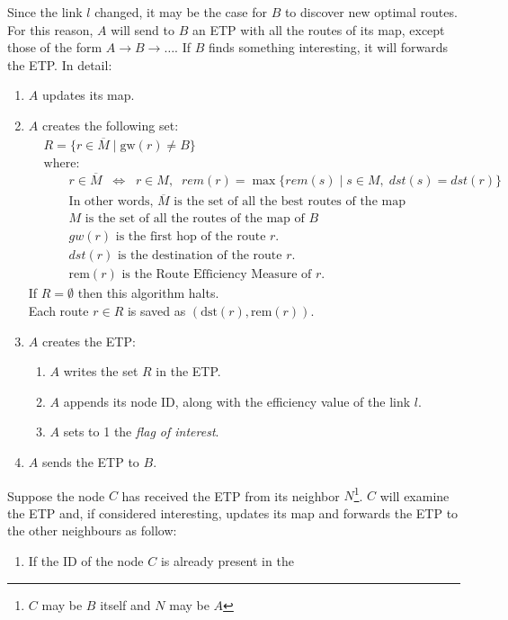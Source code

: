 \documentclass[a4paper]{article}
\newcommand{\T}[1]{\textrm{#1}}
\newcommand{\eal}[1]{{\begin{align*} #1 \end{align*}}}
\def\ove#1{{\overline{#1}}}
\newcommand{\qq}{\qquad}
\def\0{{\emptyset}}
\def\={{\;\Leftrightarrow\;}}
\begin{document}
\begin{description}
		Since the link $l$ changed, it may be the case for $B$ to
		discover new optimal routes.
		For this reason, $A$ will send to $B$ an ETP with all the routes of its
		map, except those of the form $A\rightarrow B\rightarrow \dots$. If $B$ finds
		something interesting, it will forwards the ETP. In detail:
		\begin{enumerate}
			\item $A$ updates its map.
			\item $A$ creates the following set:
			      \eal{
			      &R=\{r\in \ove M\;|\; \T{gw}(r)\neq B\}\\
			      &\T{where: }\\
			      &\qq r\in \ove M \;\= \;r\in M,\;\;  rem(r)=\max \{
			      rem(s)
			      \;|\;s\in M,\;dst(s)=dst(r) \} \\
			      &\qq\T{In other words, $\ove M$ is the set of all the best routes of the map}\\
			      &\qq M \T{ is the set of all the routes of the map of
			      $B$}\\
			      &\qq gw(r)\T{ is the first hop of the route $r$}.\\
			      &\qq dst(r) \T{ is the destination of the route $r$}.\\
			      &\qq \T{rem}(r) \T{ is the Route Efficiency Measure of
			      $r$}.
			      }
			      If $R=\0$ then this algorithm halts.\\
			      Each route $r\in R$ is saved as $(\T{dst}(r), \T{rem}(r))$.
		      \item $A$ creates the ETP:
			\begin{enumerate}
				\item $A$ writes the set $R$ in the ETP.
				\item $A$ appends its node ID, along with the efficiency
					value of the link $l$.
				\item $A$ sets to 1 the \emph{flag of interest}.
			\end{enumerate}
		      \item $A$ sends the ETP to $B$.
		\end{enumerate}
		Suppose the node $C$ has received the ETP from its neighbor
		$N$\footnote{$C$ may be $B$ itself and $N$ may be $A$}.
		$C$ will examine the ETP and, if considered interesting, updates
        its map and forwards the ETP to the other neighbours as
		follow:
		\begin{enumerate}
		\item If the ID of the node $C$ is already present in the

\end{enumerate}
\end{description}
\end{document}
